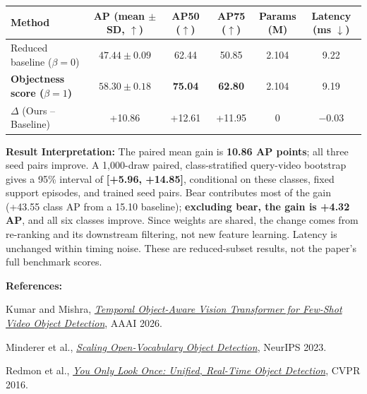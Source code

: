 \documentclass[8pt,a4paper]{article}
\begin{document}
\begin{center}
\label{tab:results}
\small
\begin{tabularx}{\linewidth}{
    @{}X c c c c c@{}
}
\toprule
\textbf{Method}
&
\makecell{\textbf{AP}\\(mean $\pm$ SD, $\uparrow$)}
&
\makecell{\textbf{AP50}\\($\uparrow$)}
&
\makecell{\textbf{AP75}\\($\uparrow$)}
&
\makecell{\textbf{Params}\\(M)}
&
\makecell{\textbf{Latency}\\(ms $\downarrow$)}
\\
\midrule
Reduced baseline ($\beta=0$) & $47.44\pm0.09$ & 62.44 & 50.85 & 2.104 & 9.22\\
\textbf{Objectness score ($\beta=1$)} & $\mathbf{58.30\pm0.18}$ & \textbf{75.04} & \textbf{62.80} & 2.104 & 9.19\\
\midrule
$\Delta$ (Ours -- Baseline) & +10.86 & +12.61 & +11.95 & 0 & $-$0.03\\
\bottomrule
\end{tabularx}
\end{center}

\vspace{-5pt}

\textbf{Result Interpretation:}
The paired mean gain is \textbf{10.86 AP points}; all three seed pairs improve. A 1,000-draw paired, class-stratified query-video bootstrap gives a 95\% interval of \textbf{[+5.96, +14.85]}, conditional on these classes, fixed support episodes, and trained seed pairs. Bear contributes most of the gain (+43.55 class AP from a 15.10 baseline); \textbf{excluding bear, the gain is +4.32 AP}, and all six classes improve. Since weights are shared, the change comes from re-ranking and its downstream filtering, not new feature learning. Latency is unchanged within timing noise. These are reduced-subset results, not the paper's full benchmark scores.

\textbf{References:}\par
[1] Kumar and Mishra, \href{https://ojs.aaai.org/index.php/AAAI/article/view/37497}{\emph{Temporal Object-Aware Vision Transformer for Few-Shot Video Object Detection}}, AAAI 2026.\par
[2] Minderer et al., \href{https://arxiv.org/abs/2306.09683}{\emph{Scaling Open-Vocabulary Object Detection}}, NeurIPS 2023.\par
[3] Redmon et al., \href{https://arxiv.org/abs/1506.02640}{\emph{You Only Look Once: Unified, Real-Time Object Detection}}, CVPR 2016.\par
\end{document}

